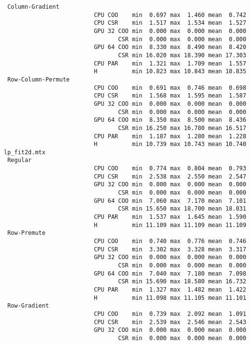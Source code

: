 \begin{verbatim}
 Column-Gradient
                          CPU COO    min  0.697 max  1.460 mean  0.742
                          CPU CSR    min  1.517 max  1.534 mean  1.527
                          GPU 32 COO min  0.000 max  0.000 mean  0.000
                                 CSR min  0.000 max  0.000 mean  0.000
                          GPU 64 COO min  8.330 max  8.490 mean  8.420
                                 CSR min 16.020 max 18.390 mean 17.303
                          CPU PAR    min  1.321 max  1.709 mean  1.557
                          H          min 10.823 max 10.843 mean 10.835
 Row-Column-Permute
                          CPU COO    min  0.691 max  0.746 mean  0.698
                          CPU CSR    min  1.568 max  1.595 mean  1.587
                          GPU 32 COO min  0.000 max  0.000 mean  0.000
                                 CSR min  0.000 max  0.000 mean  0.000
                          GPU 64 COO min  8.350 max  8.500 mean  8.436
                                 CSR min 16.250 max 16.780 mean 16.517
                          CPU PAR    min  1.187 max  1.280 mean  1.228
                          H          min 10.739 max 10.743 mean 10.740
lp_fit2d.mtx
 Regular
                          CPU COO    min  0.774 max  0.804 mean  0.793
                          CPU CSR    min  2.538 max  2.550 mean  2.547
                          GPU 32 COO min  0.000 max  0.000 mean  0.000
                                 CSR min  0.000 max  0.000 mean  0.000
                          GPU 64 COO min  7.060 max  7.170 mean  7.101
                                 CSR min 15.650 max 18.700 mean 18.031
                          CPU PAR    min  1.537 max  1.645 mean  1.590
                          H          min 11.109 max 11.109 mean 11.109
 Row-Premute
                          CPU COO    min  0.740 max  0.776 mean  0.746
                          CPU CSR    min  3.302 max  3.328 mean  3.317
                          GPU 32 COO min  0.000 max  0.000 mean  0.000
                                 CSR min  0.000 max  0.000 mean  0.000
                          GPU 64 COO min  7.040 max  7.180 mean  7.098
                                 CSR min 15.690 max 18.580 mean 16.732
                          CPU PAR    min  1.327 max  1.482 mean  1.422
                          H          min 11.098 max 11.105 mean 11.101
 Row-Gradient
                          CPU COO    min  0.739 max  2.092 mean  1.091
                          CPU CSR    min  2.539 max  2.546 mean  2.543
                          GPU 32 COO min  0.000 max  0.000 mean  0.000
                                 CSR min  0.000 max  0.000 mean  0.000

\end{verbatim}
